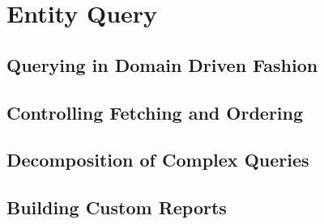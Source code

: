 \chapter{Entity Query}\label{ch01:05}

\section{Querying in Domain Driven Fashion}

\section{Controlling Fetching and Ordering}

\section{Decomposition of Complex Queries}

\section{Building Custom Reports}